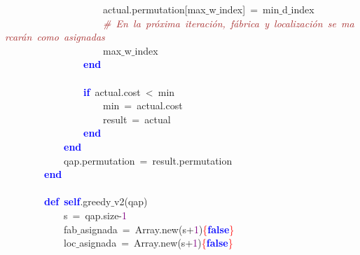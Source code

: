 \mbox{}\ \ \ \ \ \ \ \ \ \ \ \ \ \ \ \ \ \ \ \ actual\textcolor{BrickRed}{.}permutation\textcolor{BrickRed}{[}max$\_$w$\_$index\textcolor{BrickRed}{]}\ \textcolor{BrickRed}{=}\ min$\_$d$\_$index \\
\mbox{}\ \ \ \ \ \ \ \ \ \ \ \ \ \ \ \ \ \ \ \ \textit{\textcolor{Brown}{\#\ En\ la\ próxima\ iteración,\ fábrica\ y\ localización\ se\ marcarán\ como\ asignadas}} \\
\mbox{}\ \ \ \ \ \ \ \ \ \ \ \ \ \ \ \ \ \ \ \ max$\_$w$\_$index \\
\mbox{}\ \ \ \ \ \ \ \ \ \ \ \ \ \ \ \ \textbf{\textcolor{Blue}{end}} \\
\mbox{}\ \ \ \ \ \ \ \ \ \ \ \ \ \ \ \  \\
\mbox{}\ \ \ \ \ \ \ \ \ \ \ \ \ \ \ \ \textbf{\textcolor{Blue}{if}}\ actual\textcolor{BrickRed}{.}cost\ \textcolor{BrickRed}{\textless{}}\ min \\
\mbox{}\ \ \ \ \ \ \ \ \ \ \ \ \ \ \ \ \ \ \ \ min\ \textcolor{BrickRed}{=}\ actual\textcolor{BrickRed}{.}cost \\
\mbox{}\ \ \ \ \ \ \ \ \ \ \ \ \ \ \ \ \ \ \ \ result\ \textcolor{BrickRed}{=}\ actual \\
\mbox{}\ \ \ \ \ \ \ \ \ \ \ \ \ \ \ \ \textbf{\textcolor{Blue}{end}} \\
\mbox{}\ \ \ \ \ \ \ \ \ \ \ \ \textbf{\textcolor{Blue}{end}} \\
\mbox{}\ \ \ \ \ \ \ \ \ \ \ \ qap\textcolor{BrickRed}{.}permutation\ \textcolor{BrickRed}{=}\ result\textcolor{BrickRed}{.}permutation \\
\mbox{}\ \ \ \ \ \ \ \ \textbf{\textcolor{Blue}{end}} \\
\mbox{}\ \ \ \ \ \ \ \  \\
\mbox{}\ \ \ \ \ \ \ \ \textbf{\textcolor{Blue}{def}}\ \textbf{\textcolor{Blue}{self}}\textcolor{BrickRed}{.}greedy$\_$v2\textcolor{BrickRed}{(}qap\textcolor{BrickRed}{)} \\
\mbox{}\ \ \ \ \ \ \ \ \ \ \ \ s\ \textcolor{BrickRed}{=}\ qap\textcolor{BrickRed}{.}size\textcolor{BrickRed}{-}\textcolor{Purple}{1} \\
\mbox{}\ \ \ \ \ \ \ \ \ \ \ \ fab$\_$asignada\ \textcolor{BrickRed}{=}\ Array\textcolor{BrickRed}{.}new\textcolor{BrickRed}{(}s\textcolor{BrickRed}{+}\textcolor{Purple}{1}\textcolor{BrickRed}{)}\textcolor{Red}{\{}\textbf{\textcolor{Blue}{false}}\textcolor{Red}{\}} \\
\mbox{}\ \ \ \ \ \ \ \ \ \ \ \ loc$\_$asignada\ \textcolor{BrickRed}{=}\ Array\textcolor{BrickRed}{.}new\textcolor{BrickRed}{(}s\textcolor{BrickRed}{+}\textcolor{Purple}{1}\textcolor{BrickRed}{)}\textcolor{Red}{\{}\textbf{\textcolor{Blue}{false}}\textcolor{Red}{\}} \\
